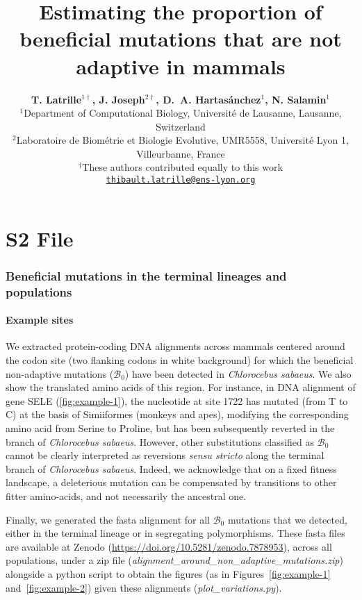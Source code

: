 \documentclass{article}
\title{\textbf{Estimating the proportion of beneficial mutations that are not adaptive in mammals}}
\author{
    \large
    \textbf{T. {Latrille}$^{1\dag}$\orcidlink{0000-0002-9643-4668}, J. {Joseph}$^{2\dag}$\orcidlink{0009-0002-1312-9930}, D.~A. {Hartasánchez}$^{1}$\orcidlink{0000-0003-2596-6883}, N. {Salamin}$^{1}$\orcidlink{0000-0002-3963-4954}}\\
    \scriptsize $^{1}$Department of Computational Biology, Université de Lausanne, Lausanne, Switzerland\\
    \scriptsize $^{2}$Laboratoire de Biométrie et Biologie Evolutive, UMR5558, Université Lyon 1, Villeurbanne, France \\
    \scriptsize $^{\dag}$These authors contributed equally to this work\\
    \normalsize \texttt{\href{mailto:thibault.latrille@ens-lyon.org}{thibault.latrille@ens-lyon.org}} \\
}
\date{}
\newcommand{\SphyBen}{\mathcal{B}_0}
\begin{document}
    \maketitle
    \part*{S2 File}
    \vspace{-1em}
    \tableofcontents
    \newpage
    \listoffigures
    \listoftables
    \newpage
    \section{Beneficial mutations in the terminal lineages and populations}\label{sec:beneficial-mutations}

    \subsection{Example sites}\label{subsec:example-sites}

    We extracted protein-coding DNA alignments across mammals centered around the codon site (two flanking codons in white background) for which the beneficial non-adaptive mutations ($\SphyBen$) have been detected in \textit{Chlorocebus sabaeus}.
    We also show the translated amino acids of this region.
    For instance, in DNA alignment of gene SELE (\ref{fig:example-1}), the nucleotide at site 1722 has mutated (from T to C) at the basis of Simiiformes (monkeys and apes), modifying the corresponding amino acid from Serine to Proline, but has been subsequently reverted in the branch of \textit{Chlorocebus sabaeus}.
    However, other substitutions classified as $\SphyBen$ cannot be clearly interpreted as reversions \textit{sensu stricto} along the terminal branch of \textit{Chlorocebus sabaeus}.
    Indeed, we acknowledge that on a fixed fitness landscape, a deleterious mutation can be compensated by transitions to other fitter amino-acids, and not necessarily the ancestral one.

    Finally, we generated the fasta alignment for all $\SphyBen$ mutations that we detected, either in the terminal lineage or in segregating polymorphisms.
    These fasta files are available at Zenodo (\url{https://doi.org/10.5281/zenodo.7878953}), across all populations, under a zip file (\textit{alignment\_around\_non\_adaptive\_mutations.zip}) alongside a python script to obtain the figures (as in Figures~\ref{fig:example-1} and~\ref{fig:example-2}) given these alignments (\textit{plot\_variations.py}).
\end{document}
